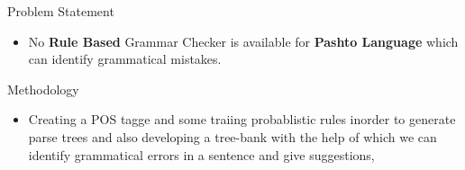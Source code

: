 \documentclass{beamer}
\begin{document}





\begin{frame}{Problem Statement}
\begin{itemize}
\item  No \textbf{Rule Based} Grammar Checker is available for \textbf{Pashto Language} which can identify grammatical mistakes.
\end{itemize}
\end{frame}


\begin{frame}{Methodology}
\begin{itemize}
	\item Creating a POS tagge and some traiing probablistic rules inorder to generate parse trees and also developing a tree-bank with the help of which we can identify grammatical errors in a sentence and give suggestions,
\end{itemize}
\end{frame}
\end{document}
